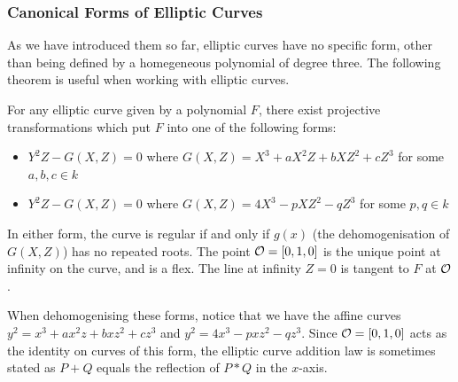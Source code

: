 \subsubsection{Canonical Forms of Elliptic Curves}
As we have introduced them so far, elliptic curves have no specific form, other than being defined by a homegeneous polynomial of degree three.
The following theorem is useful when working with elliptic curves.
\begin{theorem}
	For any elliptic curve given by a polynomial $F$, there exist projective transformations which put $F$ into one of the following forms:
	\begin{itemize}
		\item $Y^2Z - G(X,Z) = 0$ where $G(X,Z) = X^3 + aX^2Z + bXZ^2 + cZ^3$ for some $a,b,c\in k$
		\item $Y^2Z - G(X,Z) = 0$ where $G(X,Z) = 4X^3 - pXZ^2 - qZ^3$ for some $p,q\in k$
	\end{itemize}
	In either form, the curve is regular if and only if $g(x)$ (the dehomogenisation of $G(X,Z)$) has no repeated roots.
	The point $\mathcal{O} = [0,1,0]$ is the unique point at infinity on the curve, and is a flex.
	The line at infinity $Z = 0$ is tangent to $F$ at $\mathcal{O}$.
\end{theorem}
When dehomogenising these forms, notice that we have the affine curves $y^2 = x^3 + ax^2z + bxz^2 + cz^3$ and $y^2 = 4x^3 - pxz^2 - qz^3$.
Since $\mathcal{O} = [0,1,0]$ acts as the identity on curves of this form, the elliptic curve addition law is sometimes stated as $P + Q$ equals the reflection of $P * Q$ in the $x$-axis.
